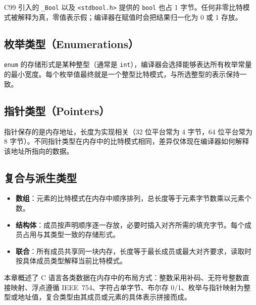 C99 引入的 \texttt{\_Bool} 以及 \texttt{<stdbool.h>} 提供的 \texttt{bool} 也占 1 字节。任何非零比特模式被解释为真，零值表示假；编译器在赋值时会把结果归一化为 0 或 1 存放。

\subsection{枚举类型（Enumerations）}

\texttt{enum} 的存储形式是某种整型（通常是 \texttt{int}），编译器会选择能够表达所有枚举常量的最小宽度。每个枚举值最终就是一个整型比特模式，与所选整型的表示保持一致。

\subsection{指针类型（Pointers）}

指针保存的是内存地址，长度为实现相关（32 位平台常为 4 字节，64 位平台常为 8 字节）。不同指针类型在内存中的比特模式相同，差异仅体现在编译器如何解释该地址所指向的数据。

\subsection{复合与派生类型}

\begin{itemize}
  \item \textbf{数组}：元素的比特模式在内存中顺序排列，总长度等于元素字节数乘以元素个数。
  \item \textbf{结构体}：成员按声明顺序逐一存放，必要时插入对齐所需的填充字节。每个成员占用与其类型一致的存储形式。
  \item \textbf{联合}：所有成员共享同一块内存，长度等于最长成员或最大对齐要求，读取时按具体成员类型解释当前比特模式。
\end{itemize}

本章概述了 C 语言各类数据在内存中的布局方式：整数采用补码、无符号整数直接映射、浮点遵循 IEEE~754、字符占单字节、布尔存 0/1、枚举与指针映射为整型或地址值，复合类型由其成员或元素的具体表示拼接而成。

